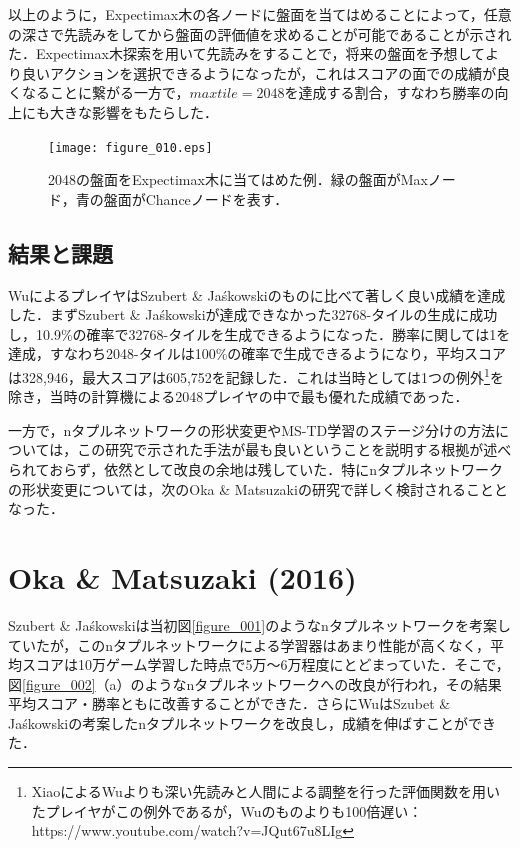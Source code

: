 \documentclass{suribt}
\begin{document}
以上のように，Expectimax木の各ノードに盤面を当てはめることによって，任意の深さで先読みをしてから盤面の評価値を求めることが可能であることが示された．Expectimax木探索を用いて先読みをすることで，将来の盤面を予想してより良いアクションを選択できるようになったが，これはスコアの面での成績が良くなることに繋がる一方で，$maxtile=2048$を達成する割合，すなわち勝率の向上にも大きな影響をもたらした．

\begin{figure}[t]
	\begin{center}
	\texttt{[image: figure\_010.eps]}
	\caption{2048の盤面をExpectimax木に当てはめた例．緑の盤面がMaxノード，青の盤面がChanceノードを表す．}
	\label{figure_010}
	\end{center}
\end{figure}

\subsection{結果と課題}
WuによるプレイヤはSzubert \& Ja\'{s}kowskiのものに比べて著しく良い成績を達成した．まずSzubert \& Ja\'{s}kowskiが達成できなかった32768-タイルの生成に成功し，10.9\%の確率で32768-タイルを生成できるようになった．勝率に関しては1を達成，すなわち2048-タイルは100\%の確率で生成できるようになり，平均スコアは328,946，最大スコアは605,752を記録した．これは当時としては1つの例外\footnote{XiaoによるWuよりも深い先読みと人間による調整を行った評価関数を用いたプレイヤがこの例外であるが，Wuのものよりも100倍遅い：https://www.youtube.com/watch?v=JQut67u8LIg}を除き，当時の計算機による2048プレイヤの中で最も優れた成績であった．

一方で，nタプルネットワークの形状変更やMS-TD学習のステージ分けの方法については，この研究で示された手法が最も良いということを説明する根拠が述べられておらず，依然として改良の余地は残していた．特にnタプルネットワークの形状変更については，次のOka \& Matsuzakiの研究で詳しく検討されることとなった．

\section{Oka \& Matsuzaki (2016)}
Szubert \& Ja\'{s}kowskiは当初図\ref{figure_001}のようなnタプルネットワークを考案していたが，このnタプルネットワークによる学習器はあまり性能が高くなく，平均スコアは10万ゲーム学習した時点で5万〜6万程度にとどまっていた．そこで，図\ref{figure_002}（a）のようなnタプルネットワークへの改良が行われ，その結果平均スコア・勝率ともに改善することができた．さらにWuはSzubet \& Ja\'{s}kowskiの考案したnタプルネットワークを改良し，成績を伸ばすことができた．
\end{document}
